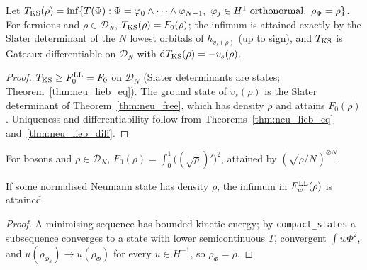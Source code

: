\begin{theorem}
  \label{thm:neu_tks}
  \leanok
  Let $T_{\rm KS}(\rho)=\inf\{T(\Phi):\Phi=\varphi_0\wedge\dots\wedge\varphi_{N-1},\ \varphi_j\in H^1\text{ orthonormal},\ \rho_\Phi=\rho\}$.
  For fermions and $\rho\in\mathcal D_N$, $T_{\rm KS}(\rho)=F_0(\rho)$; the infimum is attained exactly by the Slater determinant
  of the $N$ lowest orbitals of $h_{v_s(\rho)}$ (up to sign), and $T_{\rm KS}$ is Gateaux differentiable on $\mathcal D_N$ with
  $\mathrm dT_{\rm KS}(\rho)=-v_s(\rho)$.
\end{theorem}
\begin{proof}
  \leanok
  $T_{\rm KS}\ge F^{\rm LL}_0=F_0$ on $\mathcal D_N$ (Slater determinants are states; Theorem~\ref{thm:neu_lieb_eq}). The ground
  state of $v_s(\rho)$ is the Slater determinant of Theorem~\ref{thm:neu_free}, which has density $\rho$ and attains $F_0(\rho)$.
  Uniqueness and differentiability follow from Theorems~\ref{thm:neu_lieb_eq} and~\ref{thm:neu_lieb_diff}.
\end{proof}

\begin{corollary}
  \label{cor:neu_weizsacker}
  \leanok
  For bosons and $\rho\in\mathcal D_N$, $F_0(\rho)=\int_0^1\bigl((\sqrt\rho)'\bigr)^2$, attained by $(\sqrt{\rho/N})^{\otimes N}$.
\end{corollary}

\begin{lemma}
  \label{lem:neu_levy_attained}
  \leanok
  If some normalised Neumann state has density $\rho$, the infimum in $F^{\rm LL}_w(\rho)$ is attained.
\end{lemma}
\begin{proof}
  \leanok
  A minimising sequence has bounded kinetic energy; by \texttt{compact\_states} a subsequence converges to a state with
  lower semicontinuous $T$, convergent $\int w\Phi^2$, and $u(\rho_{\Phi_k})\to u(\rho_\Phi)$ for every $u\in H^{-1}$, so
  $\rho_\Phi=\rho$.
\end{proof}

